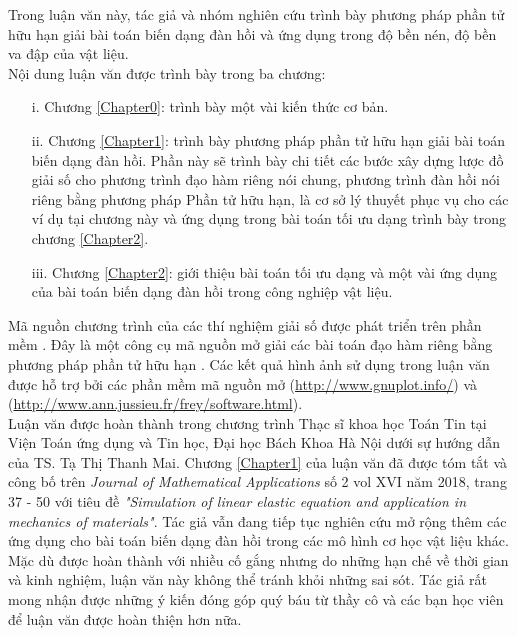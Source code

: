 \documentclass[
12pt, %
oneside, %
english, %
onehalfspacing, %
nolistspacing, %
headsepline, %
addchap,
]{MastersDoctoralThesis} %
\begin{document}
Trong luận văn này, tác giả và nhóm nghiên cứu trình bày phương pháp phần tử hữu hạn giải bài toán biến dạng đàn hồi và ứng dụng trong độ bền nén, độ bền va đập của vật liệu. \\[-0.5cm]

Nội dung luận văn được trình bày trong ba chương:
\begin{itemize}
\item[i.] Chương \ref{Chapter0}: trình bày một vài kiến thức cơ bản.
\item[ii.] Chương \ref{Chapter1}: trình bày phương pháp phần tử hữu hạn giải bài toán biến dạng đàn hồi. Phần này sẽ trình bày chi tiết các bước xây dựng lược đồ giải số cho phương trình đạo hàm riêng nói chung, phương trình đàn hồi nói riêng bằng phương pháp Phần tử hữu hạn, là cơ sở lý thuyết phục vụ cho các ví dụ tại chương này và ứng dụng trong bài toán tối ưu dạng trình bày trong chương \ref{Chapter2}.
\item[iii.] Chương \ref{Chapter2}: giới thiệu bài toán tối ưu dạng và một vài ứng dụng của bài toán biến dạng đàn hồi trong công nghiệp vật liệu.
\end{itemize}

Mã nguồn chương trình của các thí nghiệm giải số được phát triển trên phần mềm . Đây là một công cụ mã nguồn mở giải các bài toán đạo hàm riêng bằng phương pháp phần tử hữu hạn \cite{Hec12}. Các kết quả hình ảnh sử dụng trong luận văn được hỗ trợ bởi các phần mềm mã nguồn mở  (\url{http://www.gnuplot.info/}) và  (\url{http://www.ann.jussieu.fr/frey/software.html}).\\[-0.5cm]

Luận văn được hoàn thành trong chương trình Thạc sĩ khoa học Toán Tin tại Viện Toán ứng dụng và Tin học, Đại học Bách Khoa Hà Nội dưới sự hướng dẫn của TS. Tạ Thị Thanh Mai. Chương \ref{Chapter1} của luận văn đã được tóm tắt và công bố trên {\em Journal of Mathematical Applications} số 2 vol XVI năm 2018, trang 37 - 50 với tiêu đề \textit{"Simulation of linear elastic equation and application in mechanics of materials"}. Tác giả vẫn đang tiếp tục nghiên cứu mở rộng thêm các ứng dụng cho bài toán biến dạng đàn hồi trong các mô hình cơ học vật liệu khác.\\[-0.5cm]

Mặc dù được hoàn thành với nhiều cố gắng nhưng do những hạn chế về thời gian và kinh nghiệm, luận văn này không thể tránh khỏi những sai sót. Tác giả rất mong nhận được những ý kiến đóng góp quý báu từ thầy cô và các bạn học viên để luận văn được hoàn thiện hơn nữa.
\newpage
\pagestyle{thesis}
\end{document}
